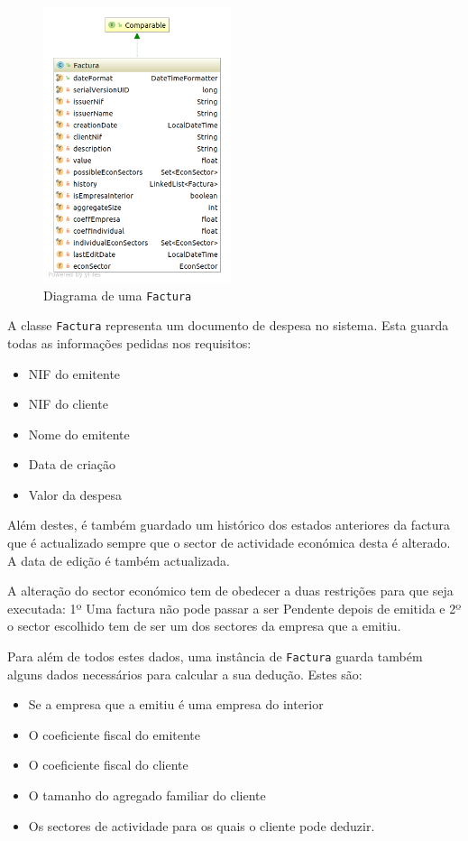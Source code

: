 \documentclass[12pt,a4paper]{report}
\begin{document}
    \begin{figure}
        \includegraphics[width=5.5cm]{./images/Factura.png}
        \caption{Diagrama de uma \texttt{Factura}}\label{fig:Factura}
    \end{figure}

    A classe \texttt{Factura} representa um documento de despesa no
    sistema. Esta guarda todas as informações pedidas nos requisitos:
    \begin{multicols}{2}
        \begin{itemize}
            \item NIF do emitente
            \item NIF do cliente
            \item Nome do emitente
            \item Data de criação
            \item Valor da despesa
        \end{itemize}
    \end{multicols}
    Além destes, é também guardado um histórico dos estados anteriores da factura
    que é actualizado sempre que o sector de actividade económica desta é
    alterado. A data de edição é também actualizada.

    A alteração do sector económico tem de obedecer a duas restrições para que
    seja executada: 1º Uma factura não pode passar a ser Pendente depois de
    emitida e 2º o sector escolhido tem de ser um dos sectores da empresa que a
    emitiu.

    Para além de todos estes dados, uma instância de \texttt{Factura}
    guarda também alguns dados necessários para calcular a sua dedução. Estes são:
    \begin{itemize}
        \item Se a empresa que a emitiu é uma empresa do interior
        \item O coeficiente fiscal do emitente
        \item O coeficiente fiscal do cliente
        \item O tamanho do agregado familiar do cliente
        \item Os sectores de actividade para os quais o cliente
            pode deduzir.
    \end{itemize}
\end{document}

